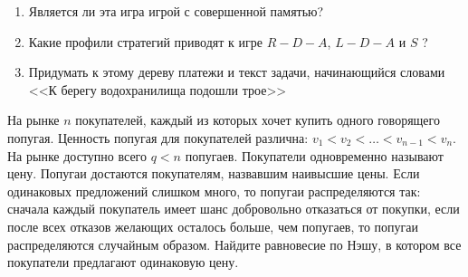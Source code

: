 \begin{problem}
{}
\begin{enumerate}
\item Является ли эта игра игрой с совершенной памятью?\par
\item Какие профили стратегий приводят к игре  $R-D-A$,  $L-D-A$  и  $S$ ?\par
\item  Придумать к этому дереву платежи и текст задачи, начинающийся словами <<К берегу водохранилища подошли трое>>
\end{enumerate}


\begin{sol}

\end{sol}
\end{problem}



\begin{problem}
\begin{source} \cite{colell:mt} \end{source}
На рынке  $n$  покупателей, каждый из которых хочет купить одного говорящего попугая. Ценность попугая для покупателей различна:  $v_{1} <v_{2} <\ldots <v_{n-1} <v_{n} $. На рынке доступно всего  $q<n$  попугаев. Покупатели одновременно называют цену. Попугаи достаются покупателям, назвавшим наивысшие цены. Если одинаковых предложений слишком много, то попугаи распределяются так: сначала каждый покупатель имеет шанс добровольно отказаться от покупки, если после всех отказов желающих осталось больше, чем попугаев, то попугаи распределяются случайным образом.
Найдите равновесие по Нэшу, в котором все покупатели предлагают одинаковую цену.\par



\begin{sol}

\end{sol}
\end{problem}



